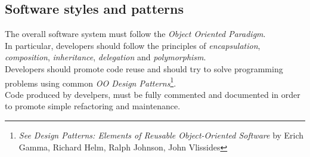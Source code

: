 \subsection{Software styles and patterns} %
\label{sub:software_styles_and_patterns}
The overall software system must follow the \emph{Object Oriented Paradigm}.\\
In particular, developers should follow the principles of \emph{encapsulation}, \emph{composition}, \emph{inheritance}, \emph{delegation} and \emph{polymorphism}.\\
Developers should promote code reuse and should try to solve programming problems using common \emph{OO Design Patterns}\footnote{\emph{See Design Patterns:
Elements of Reusable Object-Oriented Software} by Erich Gamma,
Richard Helm,
Ralph Johnson,
John Vlissides}.\\
Code produced by develpers, must be fully commented and documented in order to promote simple refactoring and maintenance.


